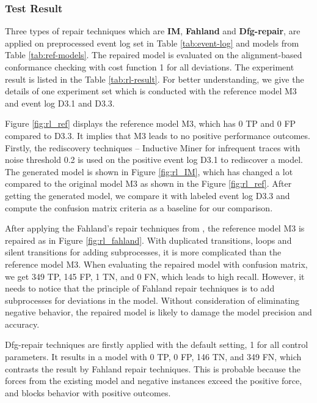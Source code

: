 \subsubsection{Test Result}
Three types of repair techniques which are \textbf{IM}, \textbf{Fahland} and \textbf{Dfg-repair}, are applied on preprocessed event log set in Table \ref{tab:event-log} and models from Table \ref{tab:ref-models}. The repaired model is evaluated on the alignment-based conformance checking with cost function 1 for all deviations. The experiment result is listed in the Table \ref{tab:rl-result}. For better understanding, we give the details of one experiment set which is conducted with the reference model M3 and event log D3.1 and D3.3.  

Figure \ref{fig:rl_ref} displays the reference model M3, which has 0 TP and 0 FP compared to D3.3. It implies that M3 leads to no positive performance outcomes. Firstly, the rediscovery techniques -- Inductive Miner for infrequent traces with noise threshold 0.2 is used on the positive event log D3.1 to rediscover a model. The generated model is shown in Figure \ref{fig:rl_IM}, which has changed a lot compared to the original model M3 as shown in the Figure \ref{fig:rl_ref}. After getting the generated model, we compare it with labeled event log D3.3 and compute the confusion matrix criteria as a baseline for our comparison. 

After applying the Fahland's repair techniques from \cite{fahland2015model}, the reference model M3 is repaired as in Figure \ref{fig:rl_fahland}. With duplicated transitions, loops and silent transitions for adding subprocesses, it is more complicated than the reference model M3. When evaluating the repaired model with confusion matrix, we get 349 TP, 145 FP, 1 TN, and 0 FN, which leads to high recall. However, it needs to notice that the principle of Fahland repair techniques is to add subprocesses for deviations in the model. Without consideration of eliminating negative behavior, the repaired model is likely to damage the model precision and accuracy.

Dfg-repair techniques are firstly applied with the default setting, 1 for all control parameters. It results in a model with 0 TP, 0 FP, 146 TN, and 349 FN,  which contrasts the result by Fahland repair techniques. This is probable because the forces from the existing model and negative instances exceed the positive force, and blocks  behavior with positive outcomes. 

